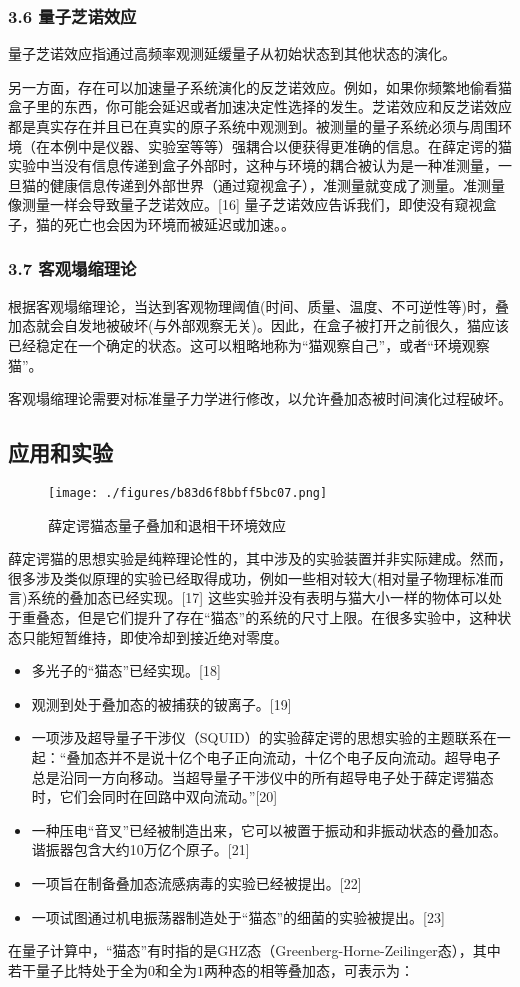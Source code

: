 \subsubsection{3.6 量子芝诺效应}
量子芝诺效应指通过高频率观测延缓量子从初始状态到其他状态的演化。

另一方面，存在可以加速量子系统演化的反芝诺效应。例如，如果你频繁地偷看猫盒子里的东西，你可能会延迟或者加速决定性选择的发生。芝诺效应和反芝诺效应都是真实存在并且已在真实的原子系统中观测到。被测量的量子系统必须与周围环境（在本例中是仪器、实验室等等）强耦合以便获得更准确的信息。在薛定谔的猫实验中当没有信息传递到盒子外部时，这种与环境的耦合被认为是一种准测量，一旦猫的健康信息传递到外部世界（通过窥视盒子），准测量就变成了测量。准测量像测量一样会导致量子芝诺效应。[16] 量子芝诺效应告诉我们，即使没有窥视盒子，猫的死亡也会因为环境而被延迟或加速。。

\subsubsection{3.7 客观塌缩理论}
根据客观塌缩理论，当达到客观物理阈值(时间、质量、温度、不可逆性等)时，叠加态就会自发地被破坏(与外部观察无关)。因此，在盒子被打开之前很久，猫应该已经稳定在一个确定的状态。这可以粗略地称为“猫观察自己”，或者“环境观察猫”。

客观塌缩理论需要对标准量子力学进行修改，以允许叠加态被时间演化过程破坏。

\subsection{应用和实验}
\begin{figure}[ht]
\centering
\texttt{[image: ./figures/b83d6f8bbff5bc07.png]}
\caption{薛定谔猫态量子叠加和退相干环境效应} \label{fig_XDEDM_5}
\end{figure}

薛定谔猫的思想实验是纯粹理论性的，其中涉及的实验装置并非实际建成。然而，很多涉及类似原理的实验已经取得成功，例如一些相对较大(相对量子物理标准而言)系统的叠加态已经实现。[17] 这些实验并没有表明与猫大小一样的物体可以处于重叠态，但是它们提升了存在“猫态”的系统的尺寸上限。在很多实验中，这种状态只能短暂维持，即使冷却到接近绝对零度。
\begin{itemize}
\item 多光子的“猫态”已经实现。[18]
\item 观测到处于叠加态的被捕获的铍离子。[19]
\item 一项涉及超导量子干涉仪（SQUID）的实验薛定谔的思想实验的主题联系在一起：“叠加态并不是说十亿个电子正向流动，十亿个电子反向流动。超导电子总是沿同一方向移动。当超导量子干涉仪中的所有超导电子处于薛定谔猫态时，它们会同时在回路中双向流动。”[20]
\item 一种压电“音叉”已经被制造出来，它可以被置于振动和非振动状态的叠加态。谐振器包含大约10万亿个原子。[21]
\item 一项旨在制备叠加态流感病毒的实验已经被提出。[22]
\item 一项试图通过机电振荡器制造处于“猫态”的细菌的实验被提出。[23]
\end{itemize}
在量子计算中，“猫态”有时指的是GHZ态（Greenberg-Horne-Zeilinger态），其中若干量子比特处于全为$0$和全为$1$两种态的相等叠加态，可表示为：